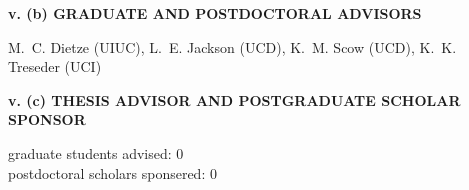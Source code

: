\documentclass[12pt]{article}
\begin{document}
\textbf{v. (b) GRADUATE AND POSTDOCTORAL ADVISORS}
\par\smallskip
M.~C. Dietze (UIUC),
L.~E. Jackson (UCD),
K.~M. Scow (UCD),
K.~K. Treseder (UCI)\\
\par\medskip

\textbf{v. (c) THESIS ADVISOR AND POSTGRADUATE SCHOLAR SPONSOR}
\par\smallskip
graduate students advised: 0\\
postdoctoral scholars sponsered: 0\\
\end{document}
